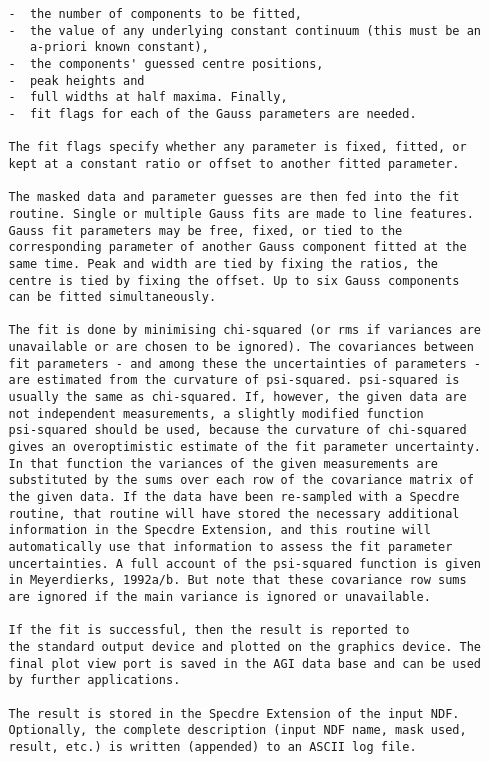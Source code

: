 \begin{description}
\begin{verbatim}
   -  the number of components to be fitted,
   -  the value of any underlying constant continuum (this must be an
      a-priori known constant),
   -  the components' guessed centre positions,
   -  peak heights and
   -  full widths at half maxima. Finally,
   -  fit flags for each of the Gauss parameters are needed.

   The fit flags specify whether any parameter is fixed, fitted, or
   kept at a constant ratio or offset to another fitted parameter.

   The masked data and parameter guesses are then fed into the fit
   routine. Single or multiple Gauss fits are made to line features.
   Gauss fit parameters may be free, fixed, or tied to the
   corresponding parameter of another Gauss component fitted at the
   same time. Peak and width are tied by fixing the ratios, the
   centre is tied by fixing the offset. Up to six Gauss components
   can be fitted simultaneously.

   The fit is done by minimising chi-squared (or rms if variances are
   unavailable or are chosen to be ignored). The covariances between
   fit parameters - and among these the uncertainties of parameters -
   are estimated from the curvature of psi-squared. psi-squared is
   usually the same as chi-squared. If, however, the given data are
   not independent measurements, a slightly modified function
   psi-squared should be used, because the curvature of chi-squared
   gives an overoptimistic estimate of the fit parameter uncertainty.
   In that function the variances of the given measurements are
   substituted by the sums over each row of the covariance matrix of
   the given data. If the data have been re-sampled with a Specdre
   routine, that routine will have stored the necessary additional
   information in the Specdre Extension, and this routine will
   automatically use that information to assess the fit parameter
   uncertainties. A full account of the psi-squared function is given
   in Meyerdierks, 1992a/b. But note that these covariance row sums
   are ignored if the main variance is ignored or unavailable.

   If the fit is successful, then the result is reported to
   the standard output device and plotted on the graphics device. The
   final plot view port is saved in the AGI data base and can be used
   by further applications.

   The result is stored in the Specdre Extension of the input NDF.
   Optionally, the complete description (input NDF name, mask used,
   result, etc.) is written (appended) to an ASCII log file.


\end{verbatim}
\end{description}
